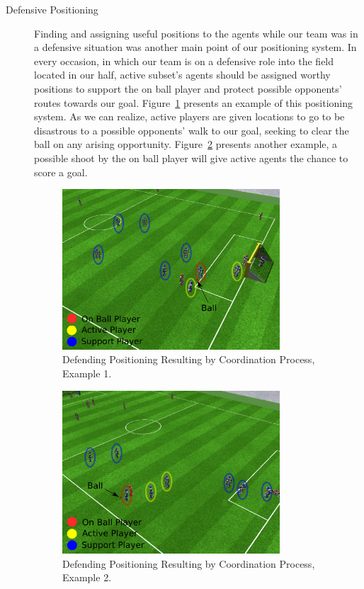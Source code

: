 \begin{description}
\item[Defensive Positioning]
Finding and assigning useful positions to the agents while our team was in a defensive situation was another main point of our positioning system. In every occasion, in which our team is on a defensive role into the field located in our half, active subset's agents should be assigned worthy positions to support the on ball player and protect possible opponents' routes towards our goal. Figure~\ref{fig:DefendingPositioning} presents an example of this positioning system. As we can realize, active players are given locations to go to be disastrous to a possible opponents' walk to our goal, seeking to clear the ball on any arising opportunity. Figure~\ref{fig:DefendingPositioning1} presents another example, a possible shoot by the on ball player will give active agents the chance to score a goal.


\begin{figure}[t!]
\centering
  \includegraphics[width=0.8\textwidth]{Chapter5/figures/1.pdf}
  \caption{Defending Positioning Resulting by Coordination Process, Example 1.} 
  \label{fig:DefendingPositioning}
\end{figure}


\begin{figure}[t!]
\centering
  \includegraphics[width=0.8\textwidth]{Chapter5/figures/2.pdf}
  \caption{Defending Positioning Resulting by Coordination Process, Example 2.} 
  \label{fig:DefendingPositioning1}
\end{figure}


\end{description}
